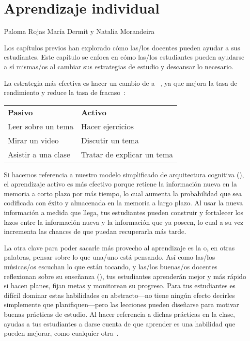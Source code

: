\chapter{Aprendizaje individual}\label{s:individual}

\begin{reviewer}
{Paloma Rojas}
{María Dermit y Natalia Morandeira}
\end{reviewer}

Los capítulos previos han explorado cómo las/los docentes pueden ayudar a sus estudiantes.
Este capítulo se enfoca en cómo las/los estudiantes pueden ayudarse a sí mismas/os
al cambiar sus estrategias de estudio y descansar lo necesario.

La estrategia más efectiva es hacer un cambio de 
a ~\cite{Hpl2018},
ya que mejora la tasa de rendimiento y reduce la tasa de fracaso~\cite{Free2014}:

\begin{longtable}{ll}
\textbf{Pasivo}        & \textbf{Activo} \\
Leer sobre un tema        & Hacer ejercicios \\
Mirar un video            & Discutir un tema \\
Asistir a una clase        & Tratar de explicar un tema
\end{longtable}

\noindent
Si hacemos referencia a nuestro modelo simplificado de arquitectura cognitiva (),
el aprendizaje activo es más efectivo porque retiene la información nueva en la memoria a corto plazo por más tiempo,
lo cual aumenta la probabilidad que sea codificada con éxito y almacenada en la memoria a largo plazo.
Al usar la nueva información a medida que llega,
tus estudiantes pueden construir y fortalecer los lazos entre la información nueva y la información que ya poseen,
lo cual a su vez incrementa las chances de que puedan recuperarla más tarde.

La otra clave para poder sacarle más provecho al aprendizaje es la 
o, en otras palabras, pensar sobre lo que una/uno está pensando.
Así como las/los músicas/os escuchan lo que están tocando,
y las/los buenas/os docentes reflexionan sobre su enseñanza (),
tus estudiantes aprenderán mejor y más rápido si hacen planes,
fijan metas
y monitorean su progreso.
Para tus estudiantes es difícil dominar estas habilidades en abstracto---no tiene
ningún efecto decirles simplemente que planifiquen---pero
las lecciones pueden diseñarse para motivar buenas prácticas de estudio.
Al hacer referencia a dichas prácticas en la clase,
ayudas a tus estudiantes a darse cuenta de que aprender es una habilidad que pueden mejorar, como cualquier otra~\cite{McGu2015,Miya2018}.

